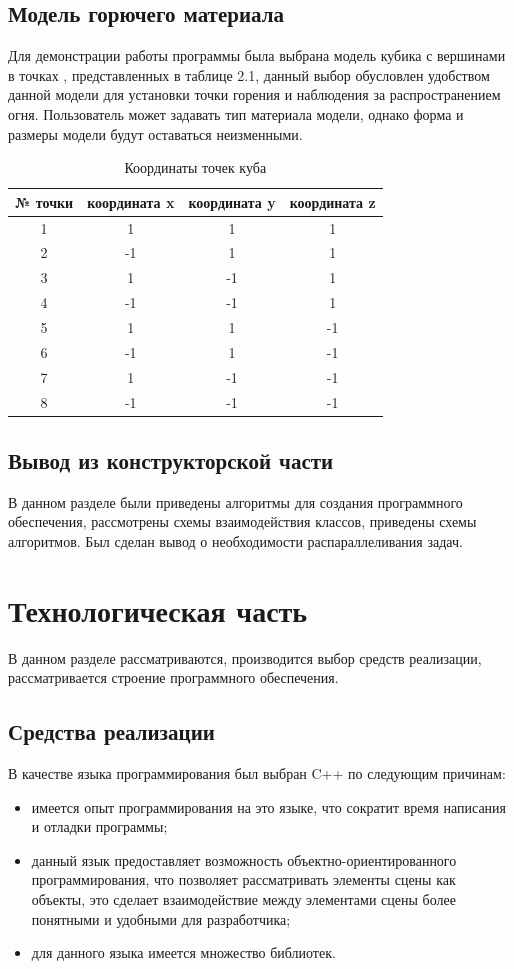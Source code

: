 \documentclass[a4paper,14pt]{report}
\begin{document}
\section{Модель горючего материала}
Для демонстрации работы программы была выбрана модель кубика с вершинами в точках , представленных в таблице 2.1, данный выбор обусловлен удобством данной модели для установки точки горения и наблюдения за распространением огня. Пользователь может задавать тип материала модели, однако форма и размеры модели будут оставаться неизменными.

\begin{table}[h]
\label{tab:toc} 
\caption{Координаты точек куба}
\begin{center}
\begin{tabular}{ | c | c | c | c |}
\hline
№ точки & координата x & координата y & координата z \\ \hline
1 & 1 & 1 & 1 \\
2 & -1 & 1 & 1 \\
3 & 1 & -1 & 1\\
4 & -1 & -1 & 1\\
5 & 1 & 1 & -1 \\
6 & -1 & 1 & -1 \\
7 & 1 & -1 & -1\\
8 & -1 & -1 & -1\\
\hline
\end{tabular}
\end{center}
\end{table}

\section*{Вывод из конструкторской части}
В данном разделе были приведены алгоритмы для создания программного обеспечения, рассмотрены схемы взаимодействия классов, приведены схемы алгоритмов.
Был сделан вывод о необходимости распараллеливания задач.

\chapter{Технологическая часть}
В данном разделе рассматриваются, производится выбор средств реализации, рассматривается строение программного обеспечения.

\section{Средства реализации}
В качестве языка программирования был выбран C++ по следующим причинам:
\begin{itemize}
\item имеется опыт программирования на это языке, что сократит время написания и отладки программы;
\item данный язык предоставляет возможность объектно-ориентированного программирования, что позволяет рассматривать элементы сцены как объекты, это сделает взаимодействие между элементами сцены более понятными и удобными для разработчика;
\item для данного языка имеется множество библиотек.
\end{itemize}
\end{document}
